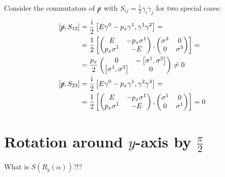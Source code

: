 \documentclass[english, parskip=full]{scrartcl}
\newcommand{\klam}{}
\def\I{\text{i}}
\begin{document}
Consider the commutators of $\cancel{p}$ with $S_{ij}=\frac{\I}{2}\gamma_i\gamma_j$ for two special cases:
\begin{align*}
\klam\left[ {\cancel{p},S_{12}} \right]&=\frac{\I}{2}\klam\left[ {E\gamma^0-p_x\gamma^1,\gamma^1\gamma^2} \right]=\\
&=\frac{1}{2}\klam\left[ {\begin{pmatrix}
E&-p_x\sigma^1 \\ p_x\sigma^1&-E
\end{pmatrix},\begin{pmatrix}
\sigma^3 & 0 \\ 0&\sigma^3
\end{pmatrix}} \right]=\\
&=\frac{p_x}{2}\begin{pmatrix}
0&-\klam\left[ {\sigma^1,\sigma^3} \right]\\
\klam\left[ {\sigma^1,\sigma^3} \right] & 0
\end{pmatrix}\neq 0\\
\klam\left[ {\cancel{p},S_{23}} \right]&=\frac{\I}{2}\klam\left[ {E\gamma^0-p_x\gamma^1,\gamma^2\gamma^3} \right]=\\
&=\frac{1}{2}\klam\left[ {\begin{pmatrix}
E&-p_x\sigma^1 \\ p_x\sigma^1&-E
\end{pmatrix},\begin{pmatrix}
\sigma^1 & 0 \\ 0&\sigma^1
\end{pmatrix}} \right]=0
\end{align*}
\section{Rotation around $y$-axis by $\frac{\pi}{2}$}
What is $S(R_y(\alpha))$?!?
\end{document}
